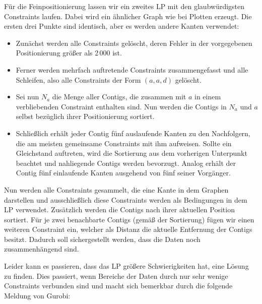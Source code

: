 Für die Feinpositionierung lassen wir ein zweites LP mit den glaubwürdigsten Constraints laufen. Dabei wird ein ähnlicher Graph wie bei Plotten erzeugt. Die ersten drei Punkte sind identisch, aber es werden andere Kanten verwendet:
\begin{itemize}
\item Zunächst werden alle Constraints gelöscht, deren Fehler in der vorgegebenen Positionierung größer als 2\,000 ist.
\item Ferner werden mehrfach auftretende Constraints zusammengefasst und alle Schleifen, also alle Constraints der Form $(a, a, d)$ gelöscht.
\item Sei nun $N_a$ die Menge aller Contigs, die zusammen mit $a$ in einem verbliebenden Constraint enthalten sind. Nun werden die Contigs in $N_a$ und $a$ selbst bezüglich ihrer Positionierung sortiert.
\item Schließlich erhält jeder Contig fünf auslaufende Kanten zu den Nachfolgern, die am meisten gemeinsame Constraints mit ihm aufweisen. Sollte ein Gleichstand auftreten, wird die Sortierung aus dem vorherigen Unterpunkt beachtet und nahliegende Contigs werden bevorzugt. Analog erhält der Contig fünf einlaufende Kanten ausgehend von fünf seiner Vorgänger.
\end{itemize}
Nun werden alle Constraints gesammelt, die eine Kante in dem Graphen darstellen und ausschließlich diese Constraints werden als Bedingungen in dem LP verwendet.
Zusätzlich werden die Contigs nach ihrer aktuellen Position sortiert. Für je zwei benachbarte Contigs (gemäß der Sortierung) fügen wir einen weiteren Constraint ein, welcher als Distanz die aktuelle Entfernung der Contigs besitzt. Dadurch soll sichergestellt werden, dass die Daten noch zusammenhängend sind.

Leider kann es passieren, dass das LP größere Schwierigkeiten hat, eine Lösung zu finden. Dies passiert, wenn Bereiche der Daten durch nur sehr wenige Constraints verbunden sind und macht sich bemerkbar durch die folgende Meldung von Gurobi: 


